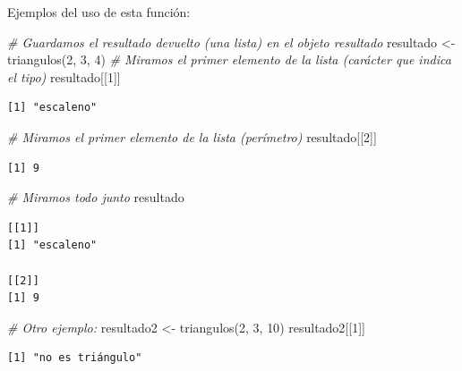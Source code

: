 \documentclass[
]{book}
\newenvironment{Shaded}{\begin{snugshade}}{\end{snugshade}}
\newcommand{\CommentTok}[1]{\textcolor[rgb]{0.56,0.35,0.01}{\textit{#1}}}
\newcommand{\DecValTok}[1]{\textcolor[rgb]{0.00,0.00,0.81}{#1}}
\newcommand{\FunctionTok}[1]{\textcolor[rgb]{0.00,0.00,0.00}{#1}}
\newcommand{\NormalTok}[1]{#1}
\newcommand{\OtherTok}[1]{\textcolor[rgb]{0.56,0.35,0.01}{#1}}
\begin{document}
Ejemplos del uso de esta función:

\begin{Shaded}
\begin{Highlighting}[]
\CommentTok{\# Guardamos el resultado devuelto (una lista) en el objeto resultado}
\NormalTok{resultado }\OtherTok{\textless{}{-}} \FunctionTok{triangulos}\NormalTok{(}\DecValTok{2}\NormalTok{, }\DecValTok{3}\NormalTok{, }\DecValTok{4}\NormalTok{)}
\CommentTok{\# Miramos el primer elemento de la lista (carácter que indica el tipo)}
\NormalTok{resultado[[}\DecValTok{1}\NormalTok{]]}
\end{Highlighting}
\end{Shaded}

\begin{verbatim}
[1] "escaleno"
\end{verbatim}

\begin{Shaded}
\begin{Highlighting}[]
\CommentTok{\# Miramos el primer elemento de la lista (perímetro)}
\NormalTok{resultado[[}\DecValTok{2}\NormalTok{]]}
\end{Highlighting}
\end{Shaded}

\begin{verbatim}
[1] 9
\end{verbatim}

\begin{Shaded}
\begin{Highlighting}[]
\CommentTok{\# Miramos todo junto}
\NormalTok{resultado}
\end{Highlighting}
\end{Shaded}

\begin{verbatim}
[[1]]
[1] "escaleno"

[[2]]
[1] 9
\end{verbatim}

\begin{Shaded}
\begin{Highlighting}[]
\CommentTok{\# Otro ejemplo:}
\NormalTok{resultado2 }\OtherTok{\textless{}{-}} \FunctionTok{triangulos}\NormalTok{(}\DecValTok{2}\NormalTok{, }\DecValTok{3}\NormalTok{, }\DecValTok{10}\NormalTok{)}
\NormalTok{resultado2[[}\DecValTok{1}\NormalTok{]]}
\end{Highlighting}
\end{Shaded}

\begin{verbatim}
[1] "no es triángulo"
\end{verbatim}
\end{document}
